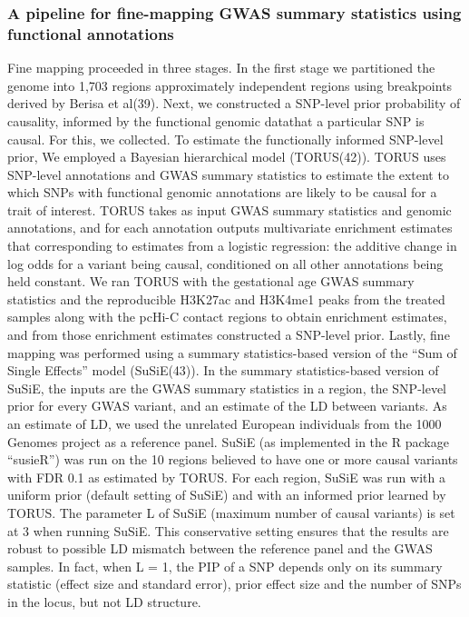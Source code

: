 \subsubsection*{A pipeline for fine-mapping GWAS summary statistics using functional annotations}
\label{sec:org24e3fbe}



Fine mapping proceeded in three stages. In the first stage we partitioned the genome into 1,703 regions approximately independent regions using breakpoints derived by Berisa et al(39).
 Next, we constructed a SNP-level prior probability of causality, informed by the functional genomic datathat a particular SNP is causal. For this, we collected. 
To estimate the functionally informed SNP-level prior, We employed a Bayesian hierarchical model (TORUS(42)).  
TORUS uses SNP-level annotations and GWAS summary statistics to estimate the extent to which SNPs with functional genomic annotations are likely to be causal for a trait of interest.  
TORUS takes as input GWAS summary statistics and genomic annotations, and for each annotation outputs multivariate enrichment estimates that corresponding to estimates from a logistic regression: 
the additive change in log odds for a variant being causal, conditioned on all other annotations being held constant.  
We ran TORUS with the gestational age GWAS summary statistics and the reproducible H3K27ac and H3K4me1 peaks from the treated samples along with the pcHi-C contact regions to obtain enrichment estimates, 
and from those enrichment estimates constructed a SNP-level prior. Lastly, fine mapping was performed using a summary statistics-based version of the “Sum of Single Effects” model (SuSiE(43)).  
In the summary statistics-based version of SuSiE, the inputs are the GWAS summary statistics in a region, the SNP-level prior for every GWAS variant, and an estimate of the LD between variants. 
As an estimate of LD, we used the unrelated European individuals from the 1000 Genomes project as a reference panel. SuSiE (as implemented in the R package “susieR”) was run on the 10 regions 
believed to have one or more causal variants with FDR 0.1 as estimated by TORUS. For each region, SuSiE was run with a uniform prior (default setting of SuSiE) and with an informed prior learned 
by TORUS. The parameter L of SuSiE (maximum number of causal variants) is set at 3 when running SuSiE. This conservative setting ensures that the results are robust to possible LD mismatch between 
the reference panel and the GWAS samples. In fact, when L = 1, the PIP of a SNP depends only on its summary statistic (effect size and standard error), prior effect size and the number of SNPs in the locus, 
but not LD structure.  


